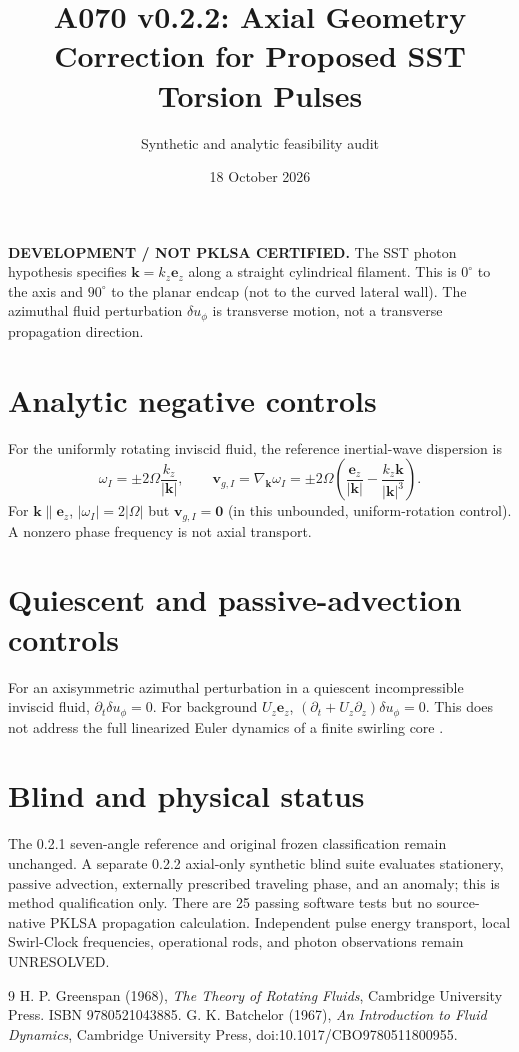 \documentclass[11pt]{article}
\begin{document}
\title{A070 v0.2.2: Axial Geometry Correction for Proposed SST Torsion Pulses}
\author{Synthetic and analytic feasibility audit}
\date{18 October 2026}\maketitle
\textbf{DEVELOPMENT / NOT PKLSA CERTIFIED.}
The SST photon hypothesis specifies $\mathbf{k}=k_z\mathbf{e}_z$ along a straight cylindrical filament. This is $0^\circ$ to the axis and $90^\circ$ to the planar endcap (not to the curved lateral wall). The azimuthal fluid perturbation $\delta u_\phi$ is transverse motion, not a transverse propagation direction.
\section{Analytic negative controls}
For the uniformly rotating inviscid fluid, the reference inertial-wave dispersion is \cite{Greenspan1968}
\begin{equation}\omega_I=\pm2\Omega\frac{k_z}{|\mathbf{k}|},\qquad
\mathbf{v}_{g,I}=\nabla_{\mathbf{k}}\omega_I
=\pm2\Omega\left(\frac{\mathbf{e}_z}{|\mathbf{k}|}-\frac{k_z\mathbf{k}}{|\mathbf{k}|^3}\right).
\end{equation}
For $\mathbf{k}\parallel\mathbf{e}_z$, $|\omega_I|=2|\Omega|$ but $\mathbf{v}_{g,I}=\mathbf0$ (in this unbounded, uniform-rotation control). A nonzero phase frequency is not axial transport.
\section{Quiescent and passive-advection controls}
For an axisymmetric azimuthal perturbation in a quiescent incompressible inviscid fluid, $\partial_t\delta u_\phi=0$. For background $U_z\mathbf{e}_z$, $(\partial_t+U_z\partial_z)\delta u_\phi=0$. This does not address the full linearized Euler dynamics of a finite swirling core \cite{Batchelor1967}.
\section{Blind and physical status}
The 0.2.1 seven-angle reference and original frozen classification remain unchanged. A separate 0.2.2 axial-only synthetic blind suite evaluates stationery, passive advection, externally prescribed traveling phase, and an anomaly; this is method qualification only. There are 25 passing software tests but no source-native PKLSA propagation calculation. Independent pulse energy transport, local Swirl-Clock frequencies, operational rods, and photon observations remain UNRESOLVED.
\begin{thebibliography}{9}
 H. P. Greenspan (1968), \emph{The Theory of Rotating Fluids}, Cambridge University Press. ISBN 9780521043885.
 G. K. Batchelor (1967), \emph{An Introduction to Fluid Dynamics}, Cambridge University Press, doi:10.1017/CBO9780511800955.
\end{thebibliography}
\end{document}
